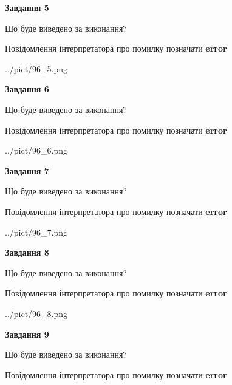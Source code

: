 \documentclass[11pt, ukrainian]{article}
\begin{document}
{\begin {large}
{\begin {center}\textbf{Завдання 5}\end {center}}\par
Що буде виведено за виконання? \par
Повідомлення інтерпретатора про помилку позначати \textbf{error}

\begin{center}
	{../pict/96_5.png}
\end{center}
\newpage

{\begin {center}\textbf{Завдання 6}\end {center}}\par
Що буде виведено за виконання? \par
Повідомлення інтерпретатора про помилку позначати \textbf{error}

\begin{center}
	{../pict/96_6.png}
\end{center}
\newpage

{\begin {center}\textbf{Завдання 7}\end {center}}\par
Що буде виведено за виконання? \par
Повідомлення інтерпретатора про помилку позначати \textbf{error}

\begin{center}
	{../pict/96_7.png}
\end{center}
\newpage

{\begin {center}\textbf{Завдання 8}\end {center}}\par
Що буде виведено за виконання? \par
Повідомлення інтерпретатора про помилку позначати \textbf{error}

\begin{center}
	{../pict/96_8.png}
\end{center}
\newpage

{\begin {center}\textbf{Завдання 9}\end {center}}\par
Що буде виведено за виконання? \par
Повідомлення інтерпретатора про помилку позначати \textbf{error}


\end{large}}
\end{document}
